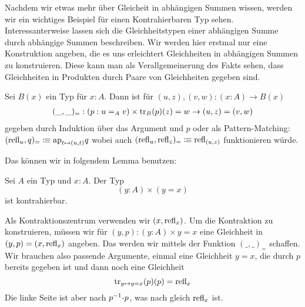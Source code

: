Nachdem wir etwas mehr über Gleicheit in abhängigen Summen wissen, werden wir ein wichtiges Beispiel für einen Kontrahierbaren Typ sehen.
Interessanterweise lassen sich die Gleichheitstypen einer abhängigen Summe durch abhängige Summen beschreiben.
Wir werden hier erstmal nur eine Konstruktion angeben, die es uns erleichtert Gleichheiten in abhängigen Summen zu konstruieren.
Diese kann man als Verallgemeinerung des Fakts sehen, dass Gleichheiten in Produkten durch Paare von Gleichheiten gegeben sind.

\begin{definition}
  Sei $B(x)$ ein Typ für $x:A$.
  Dann ist für $(u,z),(v,w):(x:A)\to B(x)$ 
  \begin{align*}
    (\_,\_)_=:(p:u=_Av)\times \mathrm{tr}_B(p)(z)=w \to (u,z)=(v,w)
  \end{align*}
  gegeben durch Induktion über das Argument und $p$ oder als Pattern-Matching:
  $(\mathrm{refl}_u,q)_=\vcentcolon\mspace{-1.2mu}\equiv \mathrm{ap}_{t\mapsto (u,t)}q$ wobei auch $(\mathrm{refl}_u,\mathrm{refl}_z)_=\vcentcolon\mspace{-1.2mu}\equiv \mathrm{refl}_{(u,z)}$ funktionieren würde.
\end{definition}

Das können wir in folgendem Lemma benutzen:

\begin{lemma}
  Sei $A$ ein Typ und $x:A$.
  Der Typ
  \[
     (y:A)\times (y=x)
  \]
  ist kontrahierbar.
\end{lemma}

\begin{beweis}
  Als Kontraktionszentrum verwenden wir $(x,\mathrm{refl}_x)$.
  Um die Kontraktion zu konstruieren, müssen wir für $(y,p):(y:A)\times y=x$ eine Gleichheit in
  $(y,p)=(x,\mathrm{refl}_x)$ angeben.
  Das werden wir mittels der Funktion $(\_,\_)_=$ schaffen.
  Wir brauchen also passende Argumente, einmal eine Gleichheit $y=x$, die durch $p$ bereits gegeben ist und dann noch eine Gleichheit
  \[
    \mathrm{tr}_{y\mapsto y=x}(p)(p)=\mathrm{refl}_x
  \]
  Die linke Seite ist aber nach  $p^{-1}\kon p$,
  was nach  gleich $\mathrm{refl}_x$ ist.
\end{beweis}
